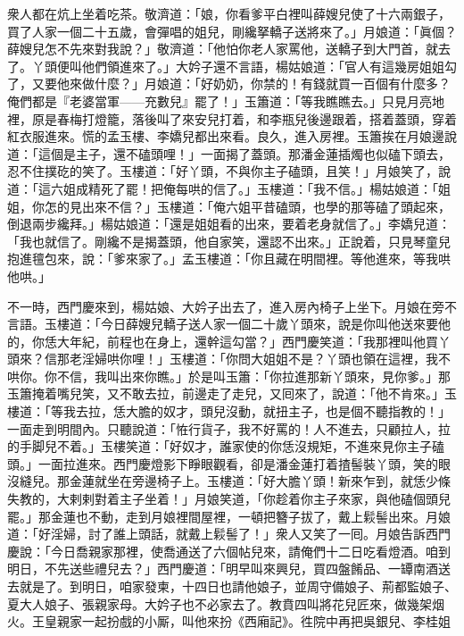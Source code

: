 衆人都在炕上坐着吃茶。敬濟道：「娘，你看爹平白裡叫薛嫂兒使了十六兩銀子，買了人家一個二十五歲，會彈唱的姐兒，剛纔拏轎子送將來了。」月娘道：「眞個？薛嫂兒怎不先來對我說？」敬濟道：「他怕你老人家罵他，送轎子到大門首，就去了。丫頭便叫他們領進來了。」大妗子還不言語，楊姑娘道：「官人有這幾房姐姐勾了，又要他來做什麼？」月娘道：「好奶奶，你禁的！有錢就買一百個有什麼多？俺們都是『老婆當軍——充數兒』罷了！」{}玉簫道：「等我瞧瞧去。」只見月亮地裡，原是春梅打燈籠，落後叫了來安兒打着，和李瓶兒後邊跟着，搭着蓋頭，穿着紅衣服進來。慌的孟玉樓、李嬌兒都出來看。{}良久，進入房裡。玉簫挨在月娘邊說道：「這個是主子，還不磕頭哩！」一面揭了蓋頭。那潘金蓮插燭也似磕下頭去，忍不住撲矻的笑了。玉樓道：「好丫頭，不與你主子磕頭，且笑！」月娘笑了，說道：「這六姐成精死了罷！把俺每哄的信了。」玉樓道：「我不信。」{}楊姑娘道：「姐姐，你怎的見出來不信？」玉樓道：「俺六姐平昔磕頭，也學的那等磕了頭起來，倒退兩步纔拜。」楊姑娘道：「還是姐姐看的出來，要着老身就信了。」李嬌兒道：「我也就信了。剛纔不是揭蓋頭，他自家笑，還認不出來。」{}正說着，只見琴童兒抱進氊包來，說：「爹來家了。」孟玉樓道：「你且藏在明間裡。等他進來，等我哄他哄。」

不一時，西門慶來到，楊姑娘、大妗子出去了，進入房內椅子上坐下。月娘在旁不言語。玉樓道：「今日薛嫂兒轎子送人家一個二十歲丫頭來，說是你叫他送來要他的，你恁大年紀，前程也在身上，還幹這勾當？」西門慶笑道：「我那裡叫他買丫頭來？信那老淫婦哄你哩！」玉樓道：「你問大姐姐不是？丫頭也領在這裡，我不哄你。你不信，我叫出來你瞧。」於是叫玉簫：「你拉進那新丫頭來，見你爹。」那玉簫掩着嘴兒笑，又不敢去拉，前邊走了走兒，又囘來了，說道：「他不肯來。」玉樓道：「等我去拉，恁大膽的奴才，頭兒沒動，就扭主子，也是個不聽指教的！」一面走到明間內。只聽說道：「恠行貨子，我不好罵的！人不進去，只顧拉人，拉的手脚兒不着。」玉樓笑道：「好奴才，誰家使的你恁沒規矩，不進來見你主子磕頭。」一面拉進來。西門慶燈影下睜眼觀看，卻是潘金蓮打着揸髻裝丫頭，笑的眼沒縫兒。{}那金蓮就坐在旁邊椅子上。玉樓道：「好大膽丫頭！新來乍到，就恁少條失教的，大剌剌對着主子坐着！」月娘笑道，「你趁着你主子來家，與他磕個頭兒罷。」那金蓮也不動，走到月娘裡間屋裡，一頓把簪子拔了，戴上鬏髻出來。月娘道：「好淫婦，討了誰上頭話，就戴上鬏髻了！」衆人又笑了一囘。月娘告訴西門慶說：「今日喬親家那裡，使喬通送了六個帖兒來，請俺們十二日吃看燈酒。咱到明日，不先送些禮兒去？」西門慶道：「明早叫來興兒，買四盤餚品、一罈南酒送去就是了。到明日，咱家發柬，十四日也請他娘子，並周守備娘子、荊都監娘子、夏大人娘子、張親家母。大妗子也不必家去了。教賁四叫將花兒匠來，做幾架烟火。王皇親家一起扮戲的小厮，叫他來扮《西廂記》。徃院中再把吳銀兒、李桂姐接了來。你們在家看燈吃酒，我和應二哥、謝子純徃獅子街樓上吃酒去。」說畢，不一時放下桌兒，安排酒上來。

